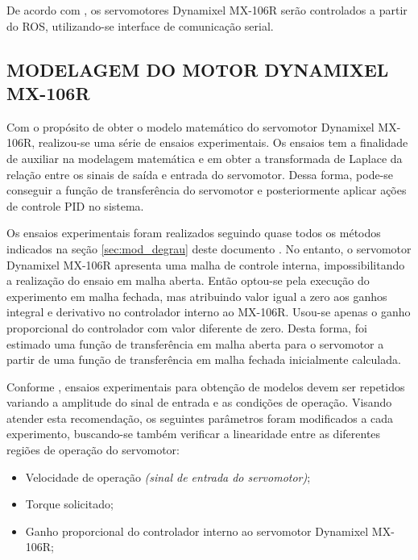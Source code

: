 \documentclass[12pt,oneside,a4paper, chapter=TITLE, section = TITLE, english, brazil]{abntex2}
\begin{document}
De acordo com , os servomotores Dynamixel MX-106R serão controlados a partir do ROS, utilizando-se interface de comunicação serial.

\subsection{MODELAGEM DO MOTOR DYNAMIXEL MX-106R}

Com o propósito de obter o modelo matemático do servomotor Dynamixel MX-106R, realizou-se uma série de ensaios experimentais. Os ensaios tem a finalidade de auxiliar na modelagem matemática e em obter a transformada de Laplace da relação entre os sinais de saída e entrada do servomotor. Dessa forma, pode-se conseguir a função de transferência do servomotor e posteriormente aplicar ações de controle PID no sistema.

Os ensaios experimentais foram realizados seguindo quase todos os métodos indicados na seção \ref{sec:mod_degrau} deste documento \cite{astrom}. No entanto, o servomotor Dynamixel MX-106R apresenta uma malha de controle interna, impossibilitando a realização do ensaio em malha aberta. Então optou-se pela execução do experimento em malha fechada, mas atribuindo valor igual a zero aos ganhos integral e derivativo no controlador interno ao MX-106R. Usou-se apenas o ganho proporcional do controlador com valor diferente de zero. Desta forma, foi estimado uma função de transferência em malha aberta para o servomotor a partir de uma função de transferência em malha fechada inicialmente calculada.

Conforme , ensaios experimentais para obtenção de modelos devem ser repetidos variando a amplitude do sinal de entrada e as condições de operação. Visando atender esta recomendação, os seguintes parâmetros foram modificados a cada experimento, buscando-se também verificar a linearidade entre as diferentes regiões de operação do servomotor:

\begin{itemize}

\item Velocidade de operação \textit{(sinal de entrada do servomotor)};

\item Torque solicitado;

\item Ganho proporcional do controlador interno ao servomotor Dynamixel MX-106R;

\end{itemize}
\end{document}
